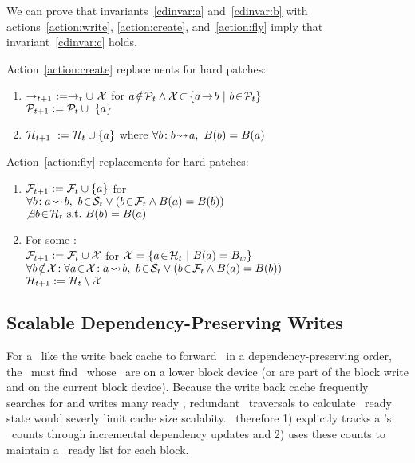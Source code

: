 We can prove that invariants~\ref{cdinvar:a} and~\ref{cdinvar:b}
with actions~\ref{action:write}, \ref{action:create}, and~\ref{action:fly}
imply that invariant~\ref{cdinvar:c} holds.

\noindent Action~\ref{action:create} replacements for hard patches:
\begin{enumerate}
\item \(\deps{t+1}\ := \deps{t} \cup\ \pset{X}\) for
\(\notinset{a}{\psetall{t}} \land \pset{X}\! \subset\!
\{\depends{a}{b}\ |\ \inset{b}{\psetall{t}}\}\)\\
\(\psetall{t+1} := \psetall{t} \cup\ \{a\}\)

\item \(\mathcal{H}_{t+1}\ := \mathcal{H}_{t} \cup \{a\}\) where \(\forall b\!:
b\! \leadsto\! a,\ B(b) = B(a)\)
\end{enumerate}

\noindent Action~\ref{action:fly} replacements for hard patches:
\begin{enumerate}
\item \(\mathcal{F}_{t+1} := \mathcal{F}_{t} \cup \{a\}\) for
\\
\(\forall b\!: \indirdepends{a}{b},\ \inset{b}{\psetsat{t}} \lor (\inset{b}{\psetinflight{t}} \land \blockof{a} = \blockof{b})\)\\
\(\not\exists\inset{b}{\psethard{t}}\ \mbox{s.t.}\ \blockof{b} = \blockof{a}\)

\item For some :\\
\(\mathcal{F}_{t+1} := \mathcal{F}_{t} \cup \mathcal{X}\) for
\(\mathcal{X} = \{a\! \in\! \mathcal{H}_{t}\ |\ B(a) = B_{w}\}\)\\
\(\forall \notinset{b}{\pset{X}}\!: \forall \inset{a}{\pset{X}}\!:
\indirdepends{a}{b},\ \inset{b}{\psetsat{t}} \lor
(\inset{b}{\psetinflight{t}} \land \blockof{a} = \blockof{b})\)\\
\(\mathcal{H}_{t+1} := \mathcal{H}_{t} \setminus \mathcal{X}\)
\end{enumerate}

\subsection{Scalable Dependency-Preserving Writes}
For a \module\ like the write back cache to forward \chdescs\ in a
dependency-preserving order, the \module\ must find \chdescs\ whose
\befores\ are on a lower block device (or are part of the block write
and on the current block device). Because the write back cache
frequently searches for and writes many ready \chdescs, redundant
\before\ traversals to calculate \chdesc\ ready state would severly
limit cache size scalabity.
%
\Kudos\ therefore
%
1) explictly tracks a \chdesc's \before\ counts through incremental
dependency updates
%
and 2) uses these counts to maintain a \chdesc\ ready list for each
block.

